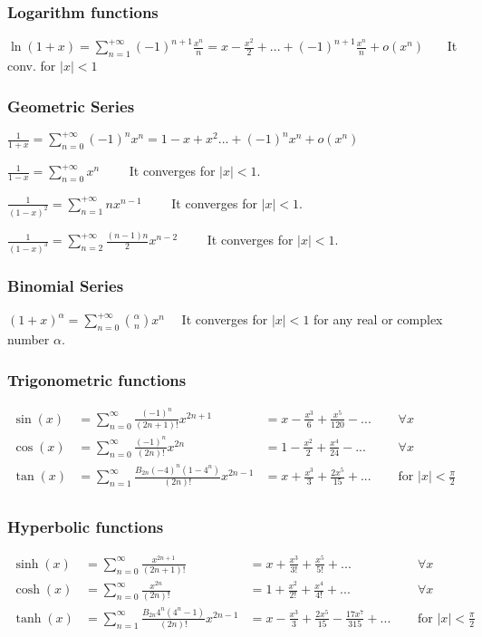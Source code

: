 \subsubsection{Logarithm functions}
$\displaystyle \ln(1+x) = \sum_{n=1}^{+\infty}(-1)^{n+1}\frac{x^n}{n} = x - \frac{x^2}{2} + ... + (-1)^{n+1}\frac{x^n}{n} + o(x^n) $ \ \ \ It conv. for $\left|x\right|<1$

\subsubsection{Geometric Series}
$\displaystyle \frac{1}{1+x} = \sum_{n=0}^{+\infty}(-1)^n x^n = 1 - x + x^2 ... + (-1)^n x^n + o(x^n)$ 

$\displaystyle \frac{1}{1-x} = \sum_{n=0}^{+\infty}x^n $ \ \ \ \ It converges for $\left|x\right|<1$.

$\displaystyle \frac{1}{(1-x)^2} = \sum_{n=1}^{+\infty}nx^{n-1} $ \ \ \ \ It converges for $\left|x\right|<1$.

$\displaystyle \frac{1}{(1-x)^3} = \sum_{n=2}^{+\infty} \frac{(n-1)n}{2} x^{n-2} $ \ \ \ \ It converges for $\left|x\right|<1$.

\subsubsection{Binomial Series}
$\displaystyle (1+x)^\alpha = \sum_{n=0}^{+\infty} \binom{\alpha}{n} x^n $ \ \ It converges for $\left|x\right|<1$ for any real or complex number $\alpha$.

\subsubsection{Trigonometric functions}
\begin{align*}
	\sin(x) &= \sum_{n=0}^{\infty} \frac{(-1)^n}{(2n+1)!}x^{2n+1} &= x - \frac{x^3}{6} + \frac{x^5}{120} - ... ~~~~~~ & \forall x & \\
	\cos(x) &= \sum_{n=0}^{\infty} \frac{(-1)^n}{(2n)!}x^{2n} &= 1 - \frac{x^2}{2} + \frac{x^4}{24} - ... ~~~~~~ & \forall x &\\
	\tan(x) &= \sum_{n=1}^{\infty} \frac{B_{2n}(-4)^n (1-4^n) }{(2n)!}x^{2n-1} &= x + \frac{x^3}{3} + \frac{2x^5}{15} + ... ~~~~~~ & \text{for } |x|<\frac{\pi}{2} &\\
\end{align*}

\subsubsection{Hyperbolic functions}
\begin{align*}
\sinh(x) &= \sum_{n=0}^{\infty} \frac{x^{2n+1}}{(2n+1)!} &= x + \frac{x^3}{3!} + \frac{x^5}{5!} + ... ~~~~~~ & \forall x & \\
\cosh(x) &= \sum_{n=0}^{\infty} \frac{x^{2n}}{(2n)!} &= 1 + \frac{x^2}{2!} + \frac{x^4}{4!} + ... ~~~~~~ & \forall x & \\
\tanh(x) &= \sum_{n=1}^{\infty} \frac{B_{2n} 4^n (4^n-1) }{(2n)!}x^{2n-1} &= x - \frac{x^3}{3} + \frac{2x^5}{15} - \frac{17x^7}{315} + ... ~~~~~~ & \text{for } |x|<\frac{\pi}{2} & \\
\end{align*}

